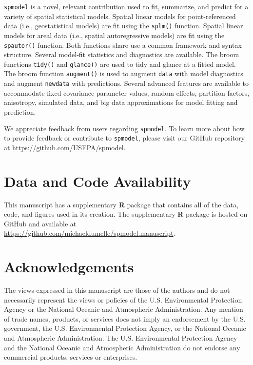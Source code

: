 \documentclass[10pt,letterpaper]{article}
\begin{document}
\texttt{spmodel} is a novel, relevant contribution used to fit,
summarize, and predict for a variety of spatial statistical models.
Spatial linear models for point-referenced data (i.e., geostatistical
models) are fit using the \texttt{splm()} function. Spatial linear
models for areal data (i.e., spatial autoregressive models) are fit
using the \texttt{spautor()} function. Both functions share use a common
framework and syntax structure. Several model-fit statistics and
diagnostics are available. The broom functions \texttt{tidy()} and
\texttt{glance()} are used to tidy and glance at a fitted model. The
broom function \texttt{augment()} is used to augment \texttt{data} with
model diagnostics and augment \texttt{newdata} with predictions. Several
advanced features are available to accommodate fixed covariance
parameter values, random effects, partition factors, anisotropy,
simulated data, and big data approximations for model fitting and
prediction.

We appreciate feedback from users regarding \texttt{spmodel}. To learn
more about how to provide feedback or contribute to \texttt{spmodel},
please visit our GitHub repository at
\url{https://github.com/USEPA/spmodel}.

\hypertarget{data-and-code-availability}{%
\section{Data and Code Availability}\label{data-and-code-availability}}

This manuscript has a supplementary \textbf{R} package that contains all
of the data, code, and figures used in its creation. The supplementary
\textbf{R} package is hosted on GitHub and available at
\url{https://github.com/michaeldumelle/spmodel.manuscript}.

\hypertarget{acknowledgements}{%
\section*{Acknowledgements}\label{acknowledgements}}

The views expressed in this manuscript are those of the authors and do
not necessarily represent the views or policies of the U.S.
Environmental Protection Agency or the National Oceanic and Atmospheric
Administration. Any mention of trade names, products, or services does
not imply an endorsement by the U.S. government, the U.S. Environmental
Protection Agency, or the National Oceanic and Atmospheric
Administration. The U.S. Environmental Protection Agency and the
National Oceanic and Atmospheric Administration do not endorse any
commercial products, services or enterprises.
\end{document}
